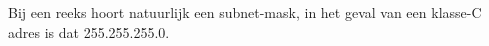 Bij een reeks hoort natuurlijk een subnet-mask, in het geval van een klasse-C adres is dat 255.255.255.0.
